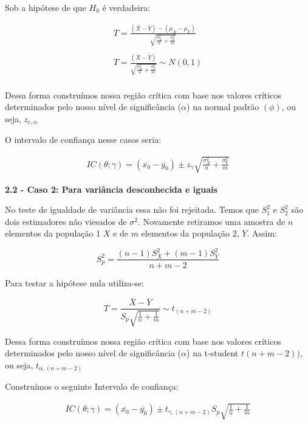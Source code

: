 \documentclass[
  letterpaper,
  DIV=11,
  numbers=noendperiod]{scrartcl}
\begin{document}
Sob a hipótese de que \(H_0\) é verdadeira:

\[\begin{array}{ccc}
T=\frac{(\overline{X}-\overline{Y})-(\mu_X-\mu_Y)}{\sqrt{\frac{\sigma^2_X}{n}+\frac{\sigma^2_Y}{m}}}
\\
\\
T=\frac{(\overline{X}-\overline{Y})}{\sqrt{\frac{\sigma^2_X}{n}+\frac{\sigma^2_Y}{m}}}\sim N(0,1)
\\
\end{array}\]

Dessa forma construímos nossa região crítica com base nos valores
críticos determinados pelo nosso nível de significância (\(\alpha\)) na
normal padrão \((\phi)\), ou seja, \(z_{c,\alpha}\)

O intervalo de confiança nesse casos seria:

\[\begin{array}{ccc}
IC(\theta;\gamma)=(\overline{x_0}-\overline{y_0})\pm z_{\gamma}\sqrt{\frac{\sigma^2_X}{n}+\frac{\sigma^2_Y}{m}}
\end{array}\]

\vspace{0.5cm}

\textbf{2.2 - Caso 2: Para variância desconhecida e iguais}

No teste de igualdade de variância essa não foi rejeitada. Temos que
\(S_1^2\) e \(S_2^2\) são dois estimadores não viesados de \(\sigma^2\).
Novamente retiramos uma amostra de \(n\) elementos da população 1 \(X\)
e de \(m\) elementos da população 2, \(Y\). Assim:

\[S_p^2=\frac{(n-1)S_X^2+(m-1)S_Y^2}{n+m-2}\]

Para testar a hipótese nula utiliza-se:

\[T=\frac{\overline{X}-\overline{Y}}{S_p\sqrt{\frac{1}{n}+\frac{1}{m}}}\sim t_{(n+m-2)}\]

Dessa forma construímos nossa região crítica com base nos valores
críticos determinados pelo nosso nível de significância (\(\alpha\)) na
t-student \(t(n+m-2))\), ou seja, \(t_{\alpha,(n+m-2)}\)

Construímos o seguinte Intervalo de confiança:

\[\begin{array}{ccc}
IC(\theta;\gamma)=(\overline{x_0}-\overline{y_0})\pm t_{\gamma,(n+m-2)}S_p\sqrt{\frac{1}{n}+\frac{1}{m}}
\end{array}\]

\vspace{0.5cm}
\end{document}

